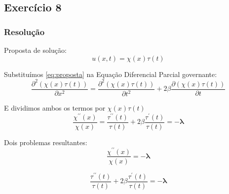 \documentclass{beamer}
\begin{document}
\subsection{Exercício 8}

\begin{frame}
\frametitle{Resolução}

Proposta de solução: 
\begin{equation}
\label{eq:proposta}
    u(x,t) = \chi(x) \tau(t)
\end{equation}

Substituímos \eqref{eq:proposta} na Equação Diferencial Parcial governante:
\begin{equation*}
    \dfrac{\partial^2\left (\chi(x) \tau(t)  \right )}{\partial x^2} = \dfrac{\partial^2\left (\chi(x) \tau(t)  \right )}{\partial t^2} + 2 \beta \dfrac{\partial \left (\chi(x) \tau(t)  \right )}{\partial t} 
\end{equation*}

E dividimos ambos os termos por $\chi(x) \tau(t)$
\begin{equation*}
    \dfrac{\chi^{\prime\prime}(x)}{\chi(x)} = \dfrac{\tau^{\prime\prime}(t)}{\tau(t)} + 2\beta\dfrac{\tau^{\prime}(t)}{\tau(t)} = - \mathbf{\lambda}
\end{equation*}

Dois problemas resultantes:
\begin{equation*}
    \dfrac{\chi^{\prime\prime}(x)}{\chi(x)} = - \mathbf{\lambda}
\end{equation*}

\begin{equation*}
    \dfrac{\tau^{\prime\prime}(t)}{\tau(t)} + 2\beta\dfrac{\tau^{\prime}(t)}{\tau(t)} = - \mathbf{\lambda}
\end{equation*}
\end{frame}

\end{document}
